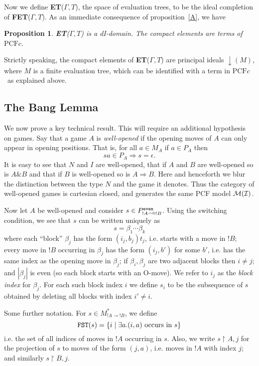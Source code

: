 \documentclass[11pt]{article}
\newtheorem{proposition}[theorem]{Proposition}
\newcommand{\even}[1]{\mbox{$#1^{\tt even}$}}
\newcommand{\Rest}{{\upharpoonright}}
\newcommand{\with}{\mbox{$\&$}}
\newcommand{\linimpl}{\mbox{$\multimap$}}
\newcommand{\pcfc}{\mbox{$\mbox{PCF}c$}}
\newcommand{\finevalT}[2]{\mbox{{\bf FET}($#1,#2$)}}
\newcommand{\evalT}[2]{\mbox{{\bf ET}($#1,#2$)}}
\begin{document}
Now we define \evalT{\Gamma}{T}, the space of evaluation trees, to be
the ideal completion of \finevalT{\Gamma}{T}.  As an immediate
consequence of proposition~\ref{A}, we have

\begin{proposition}
\evalT{\Gamma}{T} is a dI-domain.  The compact elements are terms of
\pcfc.
\end{proposition}
Strictly speaking, the compact elements of \evalT{\Gamma}{T} are
principal ideals ${\downarrow}(M)$, where $M$ is a finite evaluation
tree, which can be identified with a term in \pcfc\ as explained
above.

\subsection{The Bang Lemma}

We now prove a key technical result. This will require an additional
hypothesis on games. Say that a game $A$ is {\em well-opened} if the
opening moves of $A$ can only appear in opening positions. That is,
for all $a\in M_A$ if $a\in P_A$ then
$$ sa\in P_A \Rightarrow s=\epsilon .$$
It is easy to see that $N$ and $I$ are well-opened, that if $A$
and $B$ are well-opened so is $A\with B$ and that if $B$ is
well-opened so is $A\Rightarrow B$.
Here and henceforth we blur the distinction between the type $N$ and
the game it denotes.
Thus the category of well-opened
games is cartesian closed, and generates the same PCF model
$\cal M(I)$.


Now let $A$ be well-opened and consider $s\in \even{P_{! A\linimpl
    !B}}$.
Using the switching condition, we see that $s$ can be written uniquely
as
$$s=\beta_1\cdots\beta_k$$
where each ``block'' $\beta_j$ has the form $(i_j,b_j)t_j$,
i.e. starts with a move in $!B$; every move in $!B$ occurring in
$\beta_j$ has the form $(i_j,b')$ for some $b'$, i.e. has the same
index as the opening move in $\beta_j$; if $\beta_i,\beta_j$ are two adjacent
blocks then $i\neq j$; and $|\beta_j|$ is even (so
each block starts with an O-move). We refer to  $i_j$ as the {\em
  block index} for $\beta_j$. For each such block index $i$ we define
$s_i$ to be the subsequence of $s$ obtained by deleting all blocks
with index $i'\neq i$.

Some further notation. For $s\in M^*_{!A\linimpl !B}$, we define
$${\tt FST}(s)=\{ i \mid \exists a. (i,a)\mbox{ occurs in } s \}$$
i.e. the set of all indices of moves in $!A$ occurring in $s$. Also,
we write $s \Rest A{,j}$ for the projection of $s$ to moves of the
form $(j,a)$, i.e. moves in $!A$ with index $j$; and similarly
$s\Rest B{,j}$.
\end{document}
